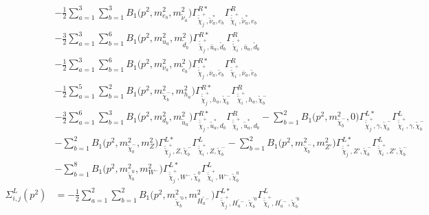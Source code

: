 \begin{itemize}
\begin{align}
 &-\frac{1}{2} \sum_{a=1}^{3}\sum_{b=1}^{3}{B_1\Big(p^{2},m^2_{e_{{b}}},m^2_{\tilde{\nu}_{{a}}}\Big)} {\Gamma^{R*}_{\check{\tilde{\chi}}^+_{{j}},\tilde{\nu}^*_{{a}},e_{{b}}}} {\Gamma^R_{\check{\tilde{\chi}}^+_{{i}},\tilde{\nu}^*_{{a}},e_{{b}}}}  \nonumber \\ 
 &-\frac{3}{2} \sum_{a=1}^{3}\sum_{b=1}^{6}{B_1\Big(p^{2},m^2_{u_{{a}}},m^2_{\tilde{d}_{{b}}}\Big)} {\Gamma^{R*}_{\check{\tilde{\chi}}^+_{{j}},\bar{u}_{{a}},\tilde{d}_{{b}}}} {\Gamma^R_{\check{\tilde{\chi}}^+_{{i}},\bar{u}_{{a}},\tilde{d}_{{b}}}}  \nonumber \\ 
 &-\frac{1}{2} \sum_{a=1}^{3}\sum_{b=1}^{6}{B_1\Big(p^{2},m^2_{\nu_{{a}}},m^2_{\tilde{e}_{{b}}}\Big)} {\Gamma^{R*}_{\check{\tilde{\chi}}^+_{{j}},\bar{\nu}_{{a}},\tilde{e}_{{b}}}} {\Gamma^R_{\check{\tilde{\chi}}^+_{{i}},\bar{\nu}_{{a}},\tilde{e}_{{b}}}}  \nonumber \\ 
 &-\frac{1}{2} \sum_{a=1}^{5}\sum_{b=1}^{2}{B_1\Big(p^{2},m^2_{\tilde{\chi}^-_{{b}}},m^2_{h_{{a}}}\Big)} {\Gamma^{R*}_{\check{\tilde{\chi}}^+_{{j}},h_{{a}},\tilde{\chi}^-_{{b}}}} {\Gamma^R_{\check{\tilde{\chi}}^+_{{i}},h_{{a}},\tilde{\chi}^-_{{b}}}}  \nonumber \\ 
 &-\frac{3}{2} \sum_{a=1}^{6}\sum_{b=1}^{3}{B_1\Big(p^{2},m^2_{d_{{b}}},m^2_{\tilde{u}_{{a}}}\Big)} {\Gamma^{R*}_{\check{\tilde{\chi}}^+_{{j}},\tilde{u}^*_{{a}},d_{{b}}}} {\Gamma^R_{\check{\tilde{\chi}}^+_{{i}},\tilde{u}^*_{{a}},d_{{b}}}}  - \sum_{b=1}^{2}{B_1\Big(p^{2},m^2_{\tilde{\chi}^-_{{b}}},0\Big)} {\Gamma^{L*}_{\check{\tilde{\chi}}^+_{{j}},\gamma,\tilde{\chi}^-_{{b}}}} {\Gamma^L_{\check{\tilde{\chi}}^+_{{i}},\gamma,\tilde{\chi}^-_{{b}}}}  \nonumber \\ 
 &- \sum_{b=1}^{2}{B_1\Big(p^{2},m^2_{\tilde{\chi}^-_{{b}}},m^2_{Z}\Big)} {\Gamma^{L*}_{\check{\tilde{\chi}}^+_{{j}},Z,\tilde{\chi}^-_{{b}}}} {\Gamma^L_{\check{\tilde{\chi}}^+_{{i}},Z,\tilde{\chi}^-_{{b}}}}  - \sum_{b=1}^{2}{B_1\Big(p^{2},m^2_{\tilde{\chi}^-_{{b}}},m^2_{{Z'}}\Big)} {\Gamma^{L*}_{\check{\tilde{\chi}}^+_{{j}},{Z'},\tilde{\chi}^-_{{b}}}} {\Gamma^L_{\check{\tilde{\chi}}^+_{{i}},{Z'},\tilde{\chi}^-_{{b}}}}  \nonumber \\ 
 &- \sum_{b=1}^{8}{B_1\Big(p^{2},m^2_{\tilde{\chi}^0_{{b}}},m^2_{W^-}\Big)} {\Gamma^{L*}_{\check{\tilde{\chi}}^+_{{j}},W^-,\tilde{\chi}^0_{{b}}}} {\Gamma^L_{\check{\tilde{\chi}}^+_{{i}},W^-,\tilde{\chi}^0_{{b}}}}  \\ 
\Sigma^L_{i,j}(p^2) &= -\frac{1}{2} \sum_{a=1}^{2}\sum_{b=1}^{2}{B_1\Big(p^{2},m^2_{\tilde{\chi}^{'0}_{{b}}},m^2_{H^{'-}_{{a}}}\Big)} {\Gamma^{L*}_{\check{\tilde{\chi}}^+_{{j}},H^{'-}_{{a}},\tilde{\chi}^{'0}_{{b}}}} {\Gamma^L_{\check{\tilde{\chi}}^+_{{i}},H^{'-}_{{a}},\tilde{\chi}^{'0}_{{b}}}}  \nonumber \\ 

\end{align}
\end{itemize}
